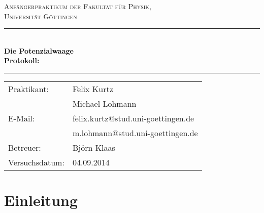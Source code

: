 \documentclass[12pt,a4paper,titlepage,headinclude,bibtotoc]{scrartcl}
\begin{document}
\begin{titlepage}
\centering
\textsc{\Large Anfängerpraktikum der Fakultät für
  Physik,\\[1.5ex] Universität Göttingen}

\vspace*{4.2cm}

\rule{\textwidth}{1pt}\\[0.5cm]
{\huge \bfseries
  Die Potenzialwaage\\[1.5ex]
  Protokoll:}\\[0.5cm]
\rule{\textwidth}{1pt}

\vspace*{3.0cm}

\begin{Large}
\begin{tabular}{ll}
Praktikant:
 	&  Felix Kurtz\\
 	&  Michael Lohmann\\

  E-Mail: 
	&  felix.kurtz@stud.uni-goettingen.de\\
	& m.lohmann@stud.uni-goettingen.de\\

 Betreuer: & Björn Klaas\\
 Versuchsdatum: & 04.09.2014\\
\end{tabular}
\end{Large}

\vspace*{0.8cm}

\begin{Large}
\end{Large}

\end{titlepage}

\tableofcontents

\newpage

\section{Einleitung}
\label{sec:einleitung}
\end{document}
